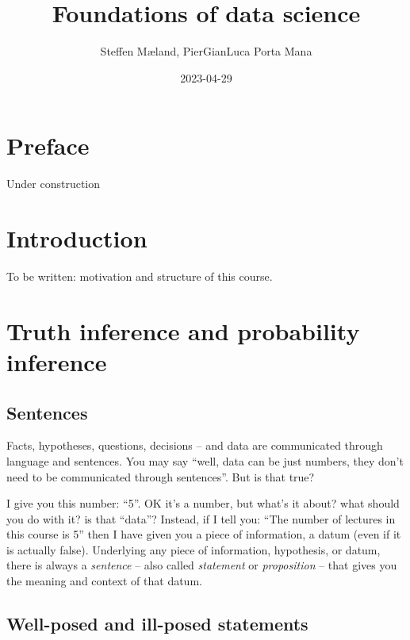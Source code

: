 \documentclass[]{book}
\title{Foundations of data science}
\author{Steffen Mæland, PierGianLuca Porta Mana}
\date{2023-04-29}
\begin{document}
\maketitle

{
\setcounter{tocdepth}{1}
\tableofcontents
}
\hypertarget{preface}{%
\chapter*{Preface}\label{preface}}

Under construction

\hypertarget{intro}{%
\chapter{Introduction}\label{intro}}

To be written: motivation and structure of this course.

\hypertarget{truth-inference-and-probability-inference}{%
\chapter{Truth inference and probability inference}\label{truth-inference-and-probability-inference}}

\hypertarget{sentences}{%
\section{Sentences}\label{sentences}}

Facts, hypotheses, questions, decisions -- and data are communicated through language and sentences. You may say ``well, data can be just numbers, they don't need to be communicated through sentences''. But is that true?

I give you this number: ``5''. OK it's a number, but what's it about? what should you do with it? is that ``data''? Instead, if I tell you: ``The number of lectures in this course is 5'' then I have given you a piece of information, a datum (even if it is actually false). Underlying any piece of information, hypothesis, or datum, there is always a \emph{sentence} -- also called \emph{statement} or \emph{proposition} -- that gives you the meaning and context of that datum.

\hypertarget{well-posed-and-ill-posed-statements}{%
\section{Well-posed and ill-posed statements}\label{well-posed-and-ill-posed-statements}}
\end{document}
